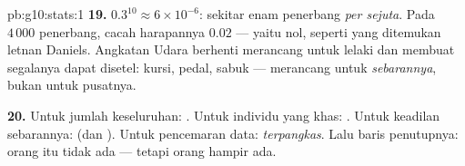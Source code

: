 \begin{solution}{pb:g10:stats:1}
\textbf{19.} $0.3^{10} \approx 6 \times 10^{-6}$: sekitar enam
penerbang \emph{per sejuta}. Pada $4\,000$ penerbang, cacah
harapannya $0.02$ --- yaitu nol, seperti yang ditemukan letnan Daniels.
Angkatan Udara berhenti merancang untuk lelaki  dan membuat
segalanya dapat disetel: kursi, pedal, sabuk --- merancang untuk
\emph{sebarannya}, bukan untuk pusatnya.

\textbf{20.} Untuk jumlah keseluruhan: \emph{}. Untuk individu yang
khas: \emph{}. Untuk keadilan sebarannya: \emph{} (dan
). Untuk pencemaran data: \emph{ terpangkas}.
Lalu baris penutupnya: orang  itu tidak ada --- tetapi orang
 hampir ada.

\end{solution}
